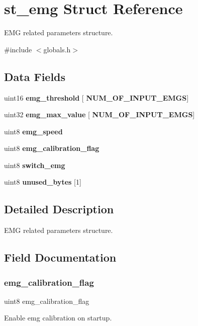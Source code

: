 \section{st\+\_\+emg Struct Reference}
\label{structst__emg}


E\+MG related parameters structure.  




{\ttfamily \#include $<$globals.\+h$>$}

\subsection*{Data Fields}
\begin{DoxyCompactItemize}
\item 
uint16 \textbf{ emg\+\_\+threshold} [\textbf{ N\+U\+M\+\_\+\+O\+F\+\_\+\+I\+N\+P\+U\+T\+\_\+\+E\+M\+GS}]
\item 
uint32 \textbf{ emg\+\_\+max\+\_\+value} [\textbf{ N\+U\+M\+\_\+\+O\+F\+\_\+\+I\+N\+P\+U\+T\+\_\+\+E\+M\+GS}]
\item 
uint8 \textbf{ emg\+\_\+speed}
\item 
uint8 \textbf{ emg\+\_\+calibration\+\_\+flag}
\item 
uint8 \textbf{ switch\+\_\+emg}
\item 
uint8 \textbf{ unused\+\_\+bytes} [1]
\end{DoxyCompactItemize}


\subsection{Detailed Description}
E\+MG related parameters structure. 



\subsection{Field Documentation}
\mbox{\label{structst__emg_a78f0b0c6db2a7118cd15ec0aa38ccdb9}} 
\subsubsection{emg\+\_\+calibration\+\_\+flag}
{\footnotesize\ttfamily uint8 emg\+\_\+calibration\+\_\+flag}

Enable emg calibration on startup. \mbox{\label{structst__emg_ad35fe7496b3455cdaf034ddc2c157163}} 

